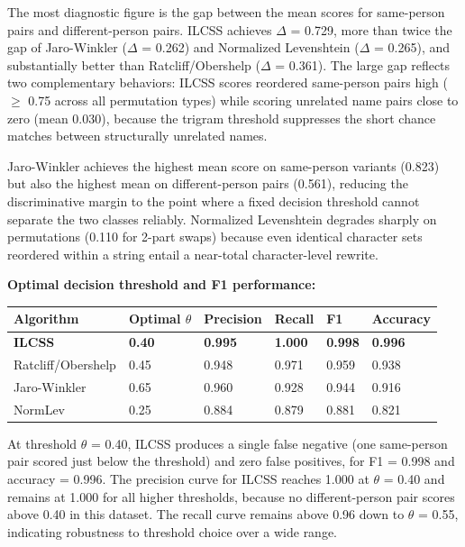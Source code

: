 \documentclass[
  11pt,
]{article}
\newcounter{none} %
\begin{document}
The most diagnostic figure is the gap between the mean scores for
same-person pairs and different-person pairs. ILCSS achieves $\Delta$ = 0.729,
more than twice the gap of Jaro-Winkler ($\Delta$ = 0.262) and Normalized
Levenshtein ($\Delta$ = 0.265), and substantially better than
Ratcliff/Obershelp ($\Delta$ = 0.361). The large gap reflects two complementary
behaviors: ILCSS scores reordered same-person pairs high ($\geq$ 0.75 across
all permutation types) while scoring unrelated name pairs close to zero
(mean 0.030), because the trigram threshold suppresses the short chance
matches between structurally unrelated names.

Jaro-Winkler achieves the highest mean score on same-person variants
(0.823) but also the highest mean on different-person pairs (0.561),
reducing the discriminative margin to the point where a fixed decision
threshold cannot separate the two classes reliably. Normalized
Levenshtein degrades sharply on permutations (0.110 for 2-part swaps)
because even identical character sets reordered within a string entail a
near-total character-level rewrite.

\textbf{Optimal decision threshold and F1 performance:}

{\def\LTcaptype{none} %
\begin{longtable}[]{@{}llllll@{}}
\toprule\noalign{}
Algorithm & Optimal $\theta$ & Precision & Recall & F1 & Accuracy \\
\midrule\noalign{}
\endhead
\bottomrule\noalign{}
\endlastfoot
\textbf{ILCSS} & \textbf{0.40} & \textbf{0.995} & \textbf{1.000} &
\textbf{0.998} & \textbf{0.996} \\
Ratcliff/Obershelp & 0.45 & 0.948 & 0.971 & 0.959 & 0.938 \\
Jaro-Winkler & 0.65 & 0.960 & 0.928 & 0.944 & 0.916 \\
NormLev & 0.25 & 0.884 & 0.879 & 0.881 & 0.821 \\
\end{longtable}
}

At threshold $\theta$ = 0.40, ILCSS produces a single false negative (one
same-person pair scored just below the threshold) and zero false
positives, for F1 = 0.998 and accuracy = 0.996. The precision curve for
ILCSS reaches 1.000 at $\theta$ = 0.40 and remains at 1.000 for all higher
thresholds, because no different-person pair scores above 0.40 in this
dataset. The recall curve remains above 0.96 down to $\theta$ = 0.55,
indicating robustness to threshold choice over a wide range.
\end{document}
